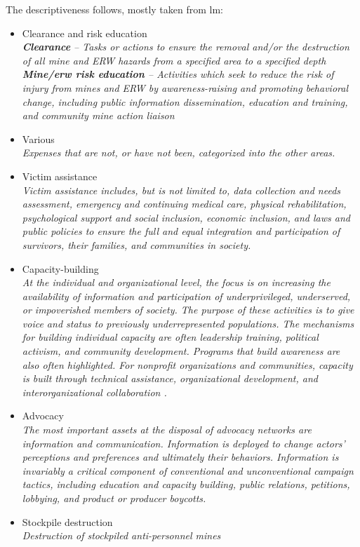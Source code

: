 The descriptiveness follows, mostly taken from \gls{lm}: 
\begin{itemize}
\setlength{\itemsep}{0.05\baselineskip}
    \item Clearance and risk education\\
    \textit{\textbf{Clearance} – Tasks or actions to ensure the removal and/or the destruction of all mine and ERW hazards from a specified area to a specified depth\\
    \textbf{Mine/\gls{erw} risk education} – Activities which seek to reduce the risk of injury from mines and  ERW by awareness-raising and  promoting behavioral  change, including public information dissemination, education and training, and community mine action liaison}
    \item Various\\
    \textit{Expenses that are not, or have not been, categorized into the other areas.}
    \item Victim assistance\\
    \textit{Victim assistance includes, but is not limited to, data collection and needs assessment, emergency and continuing medical care, physical rehabilitation, psychological support and social inclusion, economic inclusion, and laws and public policies to ensure the full and equal integration and participation of survivors, their families, and communities in society.}
    \item Capacity-building\\
    \textit{At the individual and organizational level, the focus is on increasing the availability of information and participation of underprivileged, underserved, or impoverished members of society. The purpose of these activities is to give voice and status to previously underrepresented populations. The mechanisms for building individual capacity are often leadership training, political activism, and community development. Programs that build awareness are also often highlighted. For nonprofit organizations and communities, capacity is built through technical assistance, organizational development, and interorganizational collaboration \cite{EB:capacity-building}.}
    \item Advocacy\\
    \textit{The most important assets at the disposal of advocacy networks are information and communication. Information is deployed to change actors’ perceptions and preferences and ultimately their behaviors. Information is invariably a critical component of conventional and unconventional campaign tactics, including education and capacity building, public relations, petitions, lobbying, and product or producer boycotts\cite{EB:advocacy-networking}.}
    \item Stockpile destruction\\
    \textit{Destruction of stockpiled anti-personnel mines}
\end{itemize}

\newpage